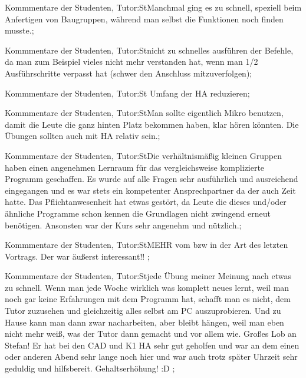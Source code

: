 \documentclass[10pt]{beamer}
\begin{document}
\begin{frame}[fragile]{Kommmentare der Studenten, Tutor:St}Manchmal ging es zu schnell, speziell beim Anfertigen von Baugruppen, während man selbst die Funktionen noch finden musste.;
 \end{frame}
\begin{frame}[fragile]{Kommmentare der Studenten, Tutor:St}nicht zu schnelles ausführen der Befehle, da man zum Beispiel vieles nicht mehr verstanden hat, wenn man 1/2 Ausführschritte verpasst hat (schwer den Anschluss mitzuverfolgen);
 \end{frame}
\begin{frame}[fragile]{Kommmentare der Studenten, Tutor:St}  Umfang der HA reduzieren;
 \end{frame}
\begin{frame}[fragile]{Kommmentare der Studenten, Tutor:St}Man sollte eigentlich Mikro benutzen, damit die Leute die ganz hinten Platz bekommen haben, klar hören könnten. Die Übungen sollten auch mit HA relativ sein.;
 \end{frame}
\begin{frame}[fragile]{Kommmentare der Studenten, Tutor:St}Die verhältnismäßig kleinen Gruppen  haben einen angenehmen Lernraum für das vergleichsweise komplizierte Programm geschaffen. Es wurde auf alle Fragen sehr ausführlich und ausreichend eingegangen und es war stets ein kompetenter Ansprechpartner da der auch Zeit hatte. Das Pflichtanwesenheit hat etwas gestört, da Leute die dieses und/oder ähnliche Programme schon kennen die Grundlagen nicht zwingend erneut benötigen. Ansonsten war der Kurs sehr angenehm und nützlich.;
 \end{frame}
\begin{frame}[fragile]{Kommmentare der Studenten, Tutor:St}MEHR vom bzw in der Art des letzten Vortrags. Der war äußerst interessant!! ;
 \end{frame}
\begin{frame}[fragile]{Kommmentare der Studenten, Tutor:St}jede Übung meiner Meinung nach etwas zu schnell. Wenn man jede Woche wirklich was komplett neues lernt, weil man noch gar keine Erfahrungen mit dem Programm hat, schafft man es nicht, dem Tutor zuzusehen und gleichzeitig alles selbst am PC auszuprobieren. Und zu Hause kann man dann zwar nacharbeiten, aber bleibt hängen, weil man eben nicht mehr weiß, was der Tutor dann gemacht und vor allem wie.  Großes Lob an Stefan! Er hat bei den CAD und K1 HA sehr gut geholfen und war an dem einen oder anderen Abend sehr lange noch hier und war auch trotz später Uhrzeit sehr geduldig und hilfsbereit.  Gehaltserhöhung! :D ;
 \end{frame}
\end{document}
